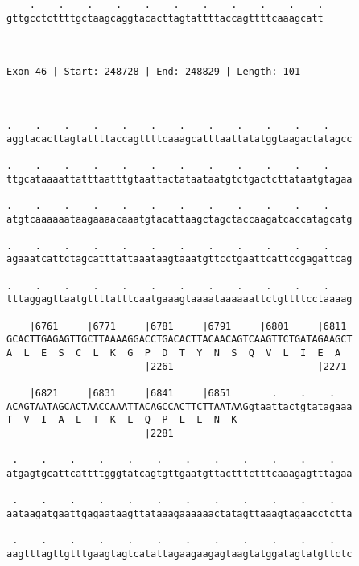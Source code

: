 \documentclass{article}
\begin{document}
\begin{Verbatim}
    .    .    .    .    .    .    .    .    .    .    .
gttgcctcttttgctaagcaggtacacttagtattttaccagttttcaaagcatt
                                                       
                                                       
 
Exon 46 | Start: 248728 | End: 248829 | Length: 101



.    .    .    .    .    .    .    .    .    .    .    .    
aggtacacttagtattttaccagttttcaaagcatttaattatatggtaagactatagcc
                                                            
.    .    .    .    .    .    .    .    .    .    .    .    
ttgcataaaattatttaatttgtaattactataataatgtctgactcttataatgtagaa
                                                            
.    .    .    .    .    .    .    .    .    .    .    .    
atgtcaaaaaataagaaaacaaatgtacattaagctagctaccaagatcaccatagcatg
                                                            
.    .    .    .    .    .    .    .    .    .    .    .    
agaaatcattctagcatttattaaataagtaaatgttcctgaattcattccgagattcag
                                                            
.    .    .    .    .    .    .    .    .    .    .    .    
tttaggagttaatgttttatttcaatgaaagtaaaataaaaaattctgttttcctaaaag
                                                            
    |6761     |6771     |6781     |6791     |6801     |6811 
GCACTTGAGAGTTGCTTAAAAGGACCTGACACTTACAACAGTCAAGTTCTGATAGAAGCT
A  L  E  S  C  L  K  G  P  D  T  Y  N  S  Q  V  L  I  E  A  
                        |2261                         |2271 
  
    |6821     |6831     |6841     |6851       .    .    .   
ACAGTAATAGCACTAACCAAATTACAGCCACTTCTTAATAAGgtaattactgtatagaaa
T  V  I  A  L  T  K  L  Q  P  L  L  N  K                    
                        |2281                               
  
 .    .    .    .    .    .    .    .    .    .    .    .   
atgagtgcattcattttgggtatcagtgttgaatgttactttctttcaaagagtttagaa
                                                            
 .    .    .    .    .    .    .    .    .    .    .    .   
aataagatgaattgagaataagttataaagaaaaaactatagttaaagtagaacctctta
                                                            
 .    .    .    .    .    .    .    .    .    .    .    .   
aagtttagttgtttgaagtagtcatattagaagaagagtaagtatggatagtatgttctc
                                                            

\end{Verbatim}
\end{document}
